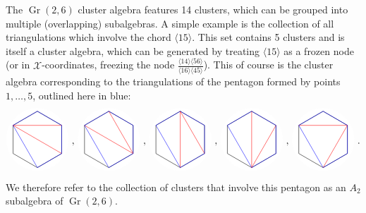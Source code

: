 \documentclass[11pt]{article}
\DeclareMathOperator{\Gr}{Gr}
\def\ket#1{\langle #1 \rangle}
\def\xcoords{$\mathcal{X}$-coordinates}
\def\drawHexagon{
\coordinate (P2) at (90:1);
\coordinate (P3) at (30:1);
\coordinate (P4) at (330:1);
\coordinate (P5) at (270:1);
\coordinate (P6) at (210:1);
\coordinate (P1) at (150:1);
\draw[white,fill=white] (0,0) circle (1.1cm);
\draw (P1) -- (P2) -- (P3) -- (P4) -- (P5) -- (P6) -- cycle;
}
\begin{document}
The $\Gr(2,6)$ cluster algebra features 14 clusters, which can be grouped into multiple (overlapping) subalgebras. A simple example is the collection of all triangulations which involve the chord $\ket{15}$. This set contains 5 clusters and is itself a cluster algebra, which can be generated by treating $\ket{15}$ as a frozen node (or in \xcoords, freezing the node $\frac{\ket{14}\ket{56}}{\ket{16}\ket{45}}$). This of course is the cluster algebra corresponding to the triangulations of the pentagon formed by points $1,\ldots,5$, outlined here in blue:
\begin{equation}
\begin{gathered}
\begin{tikzpicture}
	\drawHexagon
  	\draw[color=red] (P1) -- (P3);
  	\draw[color=red] (P1) -- (P4);
	\draw[color=blue] (P1) -- (P2) -- (P3) -- (P4) -- (P5) -- cycle;
\end{tikzpicture} 
\end{gathered}
{\ ,\ }
\begin{gathered}
\begin{tikzpicture}
	\begin{scope}[xshift=2cm]
	\drawHexagon
  	\draw[color=red] (P2) -- (P4);
  	\draw[color=red] (P1) -- (P4);
	\draw[color=blue] (P1) -- (P2) -- (P3) -- (P4) -- (P5) -- cycle;
	\end{scope}
\end{tikzpicture} 
\end{gathered}
{\ ,\ }
\begin{gathered}
\begin{tikzpicture}
	\begin{scope}[xshift=4cm]
	\drawHexagon
  	\draw[color=red] (P2) -- (P4);
  	\draw[color=red] (P2) -- (P5);
	\draw[color=blue] (P1) -- (P2) -- (P3) -- (P4) -- (P5) -- cycle;
	\end{scope}
\end{tikzpicture} 
\end{gathered}
{\ ,\ }
\begin{gathered}
\begin{tikzpicture}
	\begin{scope}[xshift=6cm]
	\drawHexagon
  	\draw[color=red] (P2) -- (P5);
  	\draw[color=red] (P3) -- (P5);
	\draw[color=blue] (P1) -- (P2) -- (P3) -- (P4) -- (P5) -- cycle;
	\end{scope}
\end{tikzpicture} 
\end{gathered}
{\ ,\ }
\begin{gathered}
\begin{tikzpicture}
	\begin{scope}[xshift=8cm]
	\drawHexagon
  	\draw[color=red] (P1) -- (P3);
  	\draw[color=red] (P3) -- (P5);
	\draw[color=blue] (P1) -- (P2) -- (P3) -- (P4) -- (P5) -- cycle;
	\end{scope}
\end{tikzpicture}
\end{gathered}\ .
\end{equation}
We therefore refer to the collection of clusters that involve this pentagon as an $A_2$ subalgebra of $\Gr(2,6)$. 
\end{document}
